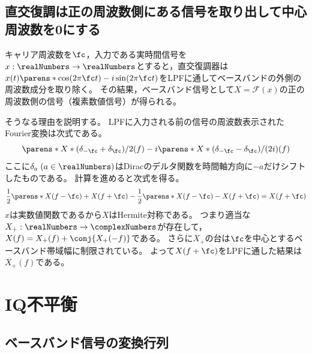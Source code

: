         \subsection{直交復調は正の周波数側にある信号を取り出して中心周波数を0にする}
            キャリア周波数を$\fc$，入力である実時間信号を$x:\realNumbers\to\realNumbers$とすると，直交復調器は$x(t)\parens*{\cos(2\pi \fc t) - i\sin(2\pi \fc t)}$をLPFに通してベースバンドの外側の周波数成分を取り除く。
            その結果，ベースバンド信号として$X = \mathcal{F}(x)$の正の周波数側の信号（複素数値信号）が得られる。
            \par
            そうなる理由を説明する。
            LPFに入力される前の信号の周波数表示されたFourier変換は次式である。
            \[ \parens*{X*(\delta_{-\fc} + \delta_{\fc})/2}(f) - i\parens*{X*(\delta_{-\fc} - \delta_{\fc})/(2i)}(f) \]
            ここに$\delta_a\;(a\in\realNumbers)$はDiracのデルタ関数を時間軸方向に$-a$だけシフトしたものである。
            計算を進めると次式を得る。
            \[ \frac{1}{2}\parens*{X(f-\fc)+X(f+\fc)} - \frac{1}{2}\parens*{X(f-\fc)-X(f+\fc)} = X(f+\fc) \]
            $x$は実数値関数であるから$X$はHermite対称である。
            つまり適当な$X_+:\realNumbers\to\complexNumbers$が存在して，$X(f) = X_+(f) + \conj{X_+(-f)}$である。
            さらに$X_+$の台は$\fc$を中心とするベースバンド帯域幅に制限されている。
            よって$X(f+\fc)$をLPFに通した結果は$X_+(f)$である。
    \section{IQ不平衡}
        \subsection{ベースバンド信号の変換行列}
